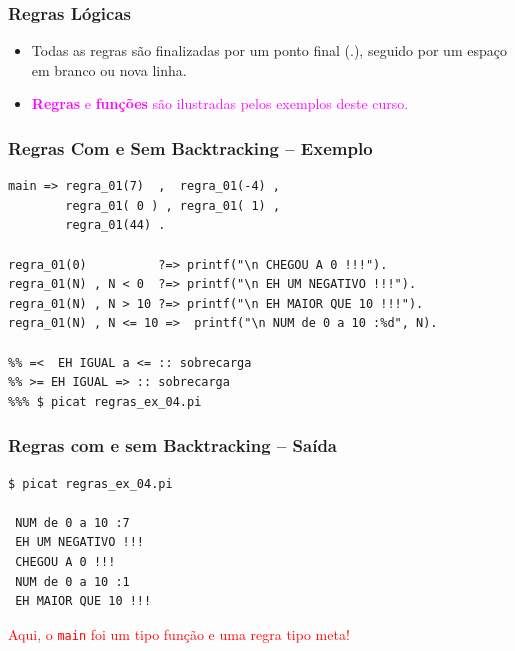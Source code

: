 \begin{frame}[fragile]
\frametitle{Regras Lógicas}
\begin{itemize} 

  \item Todas as regras são finalizadas por um ponto final (.), seguido por um espaço 
  em branco ou nova linha.

  
  \item  \textcolor{magenta}{ \textbf{Regras} e \textbf{funções} são ilustradas pelos exemplos deste curso.}
\end{itemize}

\end{frame}


\begin{frame}[fragile]
\frametitle{Regras Com e Sem Backtracking -- Exemplo}


\begin{footnotesize}
\begin{verbatim}
main => regra_01(7)  ,  regra_01(-4) ,
        regra_01( 0 ) , regra_01( 1) ,
        regra_01(44) .
        
regra_01(0)          ?=> printf("\n CHEGOU A 0 !!!").
regra_01(N) , N < 0  ?=> printf("\n EH UM NEGATIVO !!!").
regra_01(N) , N > 10 ?=> printf("\n EH MAIOR QUE 10 !!!").
regra_01(N) , N <= 10 =>  printf("\n NUM de 0 a 10 :%d", N).
          
%% =<  EH IGUAL a <= :: sobrecarga
%% >= EH IGUAL => :: sobrecarga
%%% $ picat regras_ex_04.pi
\end{verbatim}

\end{footnotesize}
\end{frame}

\begin{frame}[fragile]
	\frametitle{Regras com e sem Backtracking -- Saída}


\begin{footnotesize}
\begin{verbatim}
$ picat regras_ex_04.pi 

 NUM de 0 a 10 :7
 EH UM NEGATIVO !!!
 CHEGOU A 0 !!!
 NUM de 0 a 10 :1
 EH MAIOR QUE 10 !!!
\end{verbatim}

\end{footnotesize}
\textcolor{red}{Aqui, o \texttt{main} foi um tipo função e uma regra tipo meta!}
\end{frame}

